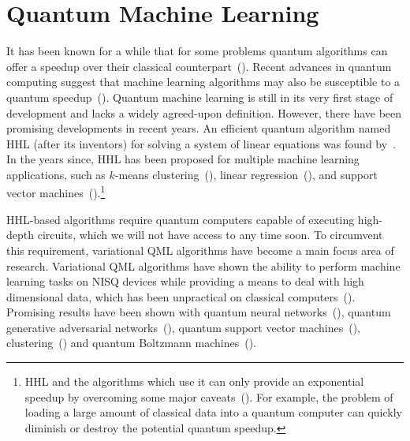 \documentclass[a4paper,10pt]{article}
\begin{document}
\section{Quantum Machine Learning} \label{sec:quantum-ml}
It has been known for a while that for some problems quantum algorithms can offer a speedup over their classical counterpart~(\cite{nielsen-chuang}).
Recent advances in quantum computing suggest that machine learning algorithms may also be susceptible to a quantum speedup~(\cite{lee2019experimental, lloyd2013quantum, gao2018quantum, yoo2014quantum, biamonte2017quantum}).
Quantum machine learning is still in its very first stage of development and lacks a widely agreed-upon definition.
However, there have been promising developments in recent years.
An efficient quantum algorithm named HHL (after its inventors) for solving a system of linear equations was found by~\textcite{harrow2009quantum}.
In the years since, HHL has been proposed for multiple machine learning applications, such as $k$-means clustering~(\cite{lloyd2013quantum}), linear regression~(\cite{schuld2016prediction, yu2017improved, wang2017quantum}), and support vector machines~(\cite{rebentrost2014quantum}).\footnote{HHL and the algorithms which use it can only provide an exponential speedup by overcoming some major caveats~(\cite{aaronson2015read}). For example, the problem of loading a large amount of classical data into a quantum computer can quickly diminish or destroy the potential quantum speedup.}

HHL-based algorithms require quantum computers capable of executing high-depth circuits, which we will not have access to any time soon.
To circumvent this requirement, variational QML algorithms have become a main focus area of research.
Variational QML algorithms have shown the ability to perform machine learning tasks on NISQ devices while providing a means to deal with high dimensional data, which has been unpractical on classical computers~(\cite{mitarai2018quantum}).
Promising results have been shown with quantum neural networks~(\cite{qnn-near-term, schuld2018circuit, grant2018hierarchical}), quantum generative adversarial networks~(\cite{romero2019variational, benedetti2019adversarial}), quantum support vector machines~(\cite{havlivcek2019supervised, schuld2019quantum, ghobadi2019power}), clustering~(\cite{otterbach2017unsupervised}) and quantum Boltzmann machines~(\cite{verdon2017quantum, anschuetz2019realizing}).
\end{document}
